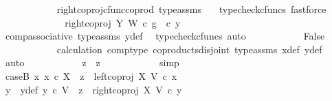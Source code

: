 \begin{isabellebody}
\ \ \ \ \ \ \ \ \ \ \isamarkupfalse%
\ right{\isacharunderscore}{\kern0pt}coproj{\isacharunderscore}{\kern0pt}cfunc{\isacharunderscore}{\kern0pt}coprod\ type{\isacharunderscore}{\kern0pt}assms\ \ \isamarkupfalse%
\ {\isacharparenleft}{\kern0pt}typecheck{\isacharunderscore}{\kern0pt}cfuncs{\isacharcomma}{\kern0pt}\ fastforce{\isacharparenright}{\kern0pt}\isanewline
\ \ \ \ \ \ \ \ \isamarkupfalse%
\ \isamarkupfalse%
\ {\isachardoublequoteopen}{\isachardot}{\kern0pt}{\isachardot}{\kern0pt}{\isachardot}{\kern0pt}\ {\isacharequal}{\kern0pt}\ right{\isacharunderscore}{\kern0pt}coproj\ Y\ W\ {\isasymcirc}\isactrlsub c\ g\ \ {\isasymcirc}\isactrlsub c\ y{}{\isachardoublequoteclose}\isanewline
\ \ \ \ \ \ \ \ \ \ \isamarkupfalse%
\ comp{\isacharunderscore}{\kern0pt}associative{}\ type{\isacharunderscore}{\kern0pt}assms{\isacharparenleft}{\kern0pt}{}{\isacharparenright}{\kern0pt}\ y{}{\isacharunderscore}{\kern0pt}def\ \isamarkupfalse%
\ {\isacharparenleft}{\kern0pt}typecheck{\isacharunderscore}{\kern0pt}cfuncs{\isacharcomma}{\kern0pt}\ auto{\isacharparenright}{\kern0pt}\isanewline
\ \ \ \ \ \ \ \ \isamarkupfalse%
\ \isamarkupfalse%
\ False\isanewline
\ \ \ \ \ \ \ \ \ \ \isamarkupfalse%
\ calculation\ comp{\isacharunderscore}{\kern0pt}type\ coproducts{\isacharunderscore}{\kern0pt}disjoint\ type{\isacharunderscore}{\kern0pt}assms\ x{}{\isacharunderscore}{\kern0pt}def\ y{}{\isacharunderscore}{\kern0pt}def\ \isamarkupfalse%
\ auto\isanewline
\ \ \ \ \ \ \ \ \isamarkupfalse%
\ \isamarkupfalse%
\ {\isachardoublequoteopen}z{}\ {\isacharequal}{\kern0pt}\ z{}{\isachardoublequoteclose}\isanewline
\ \ \ \ \ \ \ \ \ \ \isamarkupfalse%
\ simp\isanewline
\ \ \ \ \ \ \isamarkupfalse%
\isanewline
\ \ \ \ \isamarkupfalse%
\isanewline
\ \ \ \ \ \ \isamarkupfalse%
\ caseB{\isacharcolon}{\kern0pt}\ {\isachardoublequoteopen}{\isasymnexists}x{}{\isachardot}{\kern0pt}\ x{}\ {\isasymin}\isactrlsub c\ X\ {\isasymand}\ z{}\ {\isacharequal}{\kern0pt}\ left{\isacharunderscore}{\kern0pt}coproj\ X\ V\ {\isasymcirc}\isactrlsub c\ x{}{\isachardoublequoteclose}\isanewline
\ \ \ \ \ \ \isamarkupfalse%
\ \isamarkupfalse%
\ y{}\ \ y{}{\isacharunderscore}{\kern0pt}def{\isacharcolon}{\kern0pt}\ {\isachardoublequoteopen}{\isacharparenleft}{\kern0pt}y{}\ {\isasymin}\isactrlsub c\ V\ {\isasymand}\ z{}\ {\isacharequal}{\kern0pt}\ right{\isacharunderscore}{\kern0pt}coproj\ X\ V\ {\isasymcirc}\isactrlsub c\ y{}{\isacharparenright}{\kern0pt}{\isachardoublequoteclose}\isanewline

\end{isabellebody}
